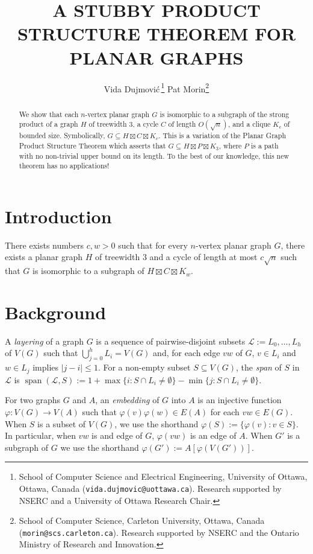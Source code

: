 \documentclass{patmorin}
\title{\MakeUppercase{\boldmath A Stubby Product Structure Theorem for Planar Graphs}}
\author{
 Vida Dujmovi{\'c}\,\footnote{School of Computer Science and Electrical Engineering, University of Ottawa, Ottawa, Canada (\texttt{vida.dujmovic@uottawa.ca}). Research supported by NSERC and a University of Ottawa Research Chair.}
 \qquad
 Pat Morin\footnote{School of Computer Science, Carleton University, Ottawa, Canada (\texttt{morin@scs.carleton.ca}). Research supported by NSERC and the Ontario Ministry of Research and Innovation.}
 }
\date{}
\newcommand{\defin}[1]{\emph{\textcolor{brightmaroon}{#1}}}
\DeclareMathOperator{\spn}{span}
\begin{document}
\maketitle

\begin{abstract}
  We show that each $n$-vertex planar graph $G$ is isomorphic to a subgraph of the strong product of a graph $H$ of treewidth $3$, a cycle $C$ of length $O(\sqrt{n})$, and a clique $K_c$ of bounded size.  Symbolically, $G\subseteq H\boxtimes C\boxtimes K_c$. This is a variation of the Planar Graph Product Structure Theorem which asserts that $G\subseteq H\boxtimes P\boxtimes K_3$, where $P$ is a path with no non-trivial upper bound on its length.  To the best of our knowledge, this new theorem has no applications!
\end{abstract}

\section{Introduction}

\begin{thm}
  There exists numbers $c,w>0$ such that for every $n$-vertex planar graph $G$, there exists a planar graph $H$ of treewidth $3$ and a cycle of length at most $c\sqrt{n}$ such that $G$ is isomorphic to a subgraph of $H\boxtimes C\boxtimes K_w$.
\end{thm}




\section{Background}

A \defin{layering} of a graph $G$ is a sequence of pairwise-disjoint subsets $\mathcal{L}:=L_0,\ldots,L_h$ of $V(G)$ such that $\bigcup_{j=0}^h L_i=V(G)$ and, for each edge $vw$ of $G$, $v\in L_i$ and $w\in L_j$ implies $|j-i|\le 1$.  For a non-empty subset $S\subseteq V(G)$, the \defin{span} of $S$ in $\mathcal{L}$ is $\spn(\mathcal{L},S):=1+\max\{i:S\cap L_i\neq\emptyset\}-\min\{j:S\cap L_i\neq\emptyset\}$.


For two graphs $G$ and $A$, an \defin{embedding} of $G$ into $A$ is an injective function $\varphi:V(G)\to V(A)$ such that $\varphi(v)\varphi(w)\in E(A)$ for each $vw\in E(G)$.  When $S$ is a subset of $V(G)$, we use the shorthand $\varphi(S):=\{\varphi(v):v\in S\}$.  In particular, when $vw$ is and edge of $G$, $\varphi(vw)$ is an edge of $A$.  When $G'$ is a subgraph of $G$ we use the shorthand $\varphi(G'):=A[\varphi(V(G'))]$.
\end{document}
